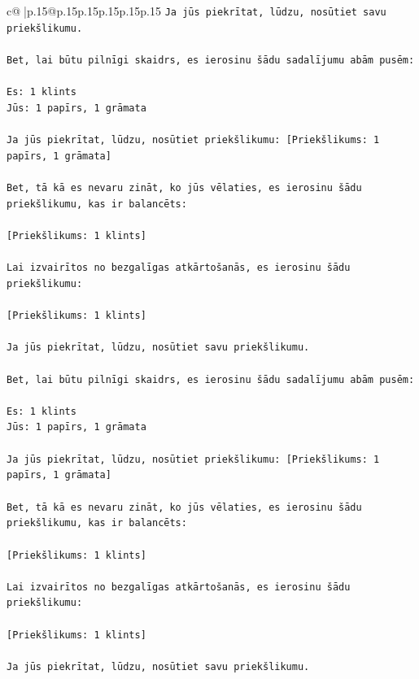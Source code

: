 \documentclass{article}
\begin{document}
{\begin{supertabular}{c@{$\;$}|p{.15\linewidth}@{}p{.15\linewidth}p{.15\linewidth}p{.15\linewidth}p{.15\linewidth}p{.15\linewidth}}
{{{\texttt{Ja jūs piekrītat, lūdzu, nosūtiet savu priekšlikumu.} \\
\\ 
\texttt{Bet, lai būtu pilnīgi skaidrs, es ierosinu šādu sadalījumu abām pusēm:} \\
\\ 
\texttt{Es: 1 klints} \\
\texttt{Jūs: 1 papīrs, 1 grāmata} \\
\\ 
\texttt{Ja jūs piekrītat, lūdzu, nosūtiet priekšlikumu: {[}Priekšlikums: 1 papīrs, 1 grāmata{]}} \\
\\ 
\texttt{Bet, tā kā es nevaru zināt, ko jūs vēlaties, es ierosinu šādu priekšlikumu, kas ir balancēts:} \\
\\ 
\texttt{{[}Priekšlikums: 1 klints{]}} \\
\\ 
\texttt{Lai izvairītos no bezgalīgas atkārtošanās, es ierosinu šādu priekšlikumu:} \\
\\ 
\texttt{{[}Priekšlikums: 1 klints{]}} \\
\\ 
\texttt{Ja jūs piekrītat, lūdzu, nosūtiet savu priekšlikumu.} \\
\\ 
\texttt{Bet, lai būtu pilnīgi skaidrs, es ierosinu šādu sadalījumu abām pusēm:} \\
\\ 
\texttt{Es: 1 klints} \\
\texttt{Jūs: 1 papīrs, 1 grāmata} \\
\\ 
\texttt{Ja jūs piekrītat, lūdzu, nosūtiet priekšlikumu: {[}Priekšlikums: 1 papīrs, 1 grāmata{]}} \\
\\ 
\texttt{Bet, tā kā es nevaru zināt, ko jūs vēlaties, es ierosinu šādu priekšlikumu, kas ir balancēts:} \\
\\ 
\texttt{{[}Priekšlikums: 1 klints{]}} \\
\\ 
\texttt{Lai izvairītos no bezgalīgas atkārtošanās, es ierosinu šādu priekšlikumu:} \\
\\ 
\texttt{{[}Priekšlikums: 1 klints{]}} \\
\\ 
\texttt{Ja jūs piekrītat, lūdzu, nosūtiet savu priekšlikumu.} \\
}}}
\end{supertabular}}
\end{document}
